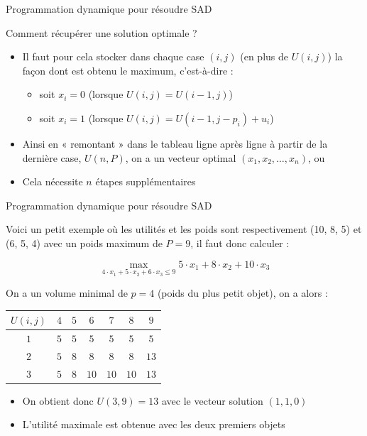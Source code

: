 \documentclass[aspectratio=1610,francais,envcountsect]{beamer}
\begin{document}
\begin{frame}[allowframebreaks]{Programmation dynamique pour résoudre
    SAD}
\begin{block}{Comment récupérer une solution optimale ?}
  \begin{itemize}
  \item Il faut pour cela stocker dans chaque case $(i, j)$ (en plus
    de $U(i, j)$) la façon dont est obtenu le maximum, c’est-à-dire :
    \begin{itemize}
    \item soit $x_i = 0$ (lorsque $U(i, j) = U(i - 1, j)$)
    \item soit $x_i = 1$ (lorsque $U(i, j) = U(i - 1, j - p_i) + u_i$)
    \end{itemize}
  \item Ainsi en « remontant » dans le tableau ligne après ligne à
    partir de la dernière case, $U(n, P)$, on a un vecteur optimal
    $(x_1, x_2, \ldots , x_n)$, ou 
  \item Cela nécessite $n$ étapes supplémentaires
  \end{itemize}
\end{block}
\end{frame}

\begin{frame}{Programmation dynamique pour résoudre SAD
    \insertcontinuationtext}

  \begin{example}

    Voici un petit exemple où les utilités et les poids sont
    respectivement (10, 8, 5) et (6, 5, 4) avec un poids maximum de
    $P = 9$, il faut donc calculer :
    
    \begin{equation}
      \max_{4\cdot x_1+5\cdot x_2+6\cdot x_3\leq 9}5\cdot x_1+8\cdot x_2 + 10\cdot x_3
    \end{equation}
    
    \pause
    
    On a un volume minimal de $p = 4$ (poids du plus petit objet), on
    a alors :
    
    
    \begin{table}[H]
      \centering
      \begin{tabular}{c|cccccc}
        $U(i,j)$ & $4$ & $5$ & $6$ & $7$ & $8$ & $9$\\
        \hline
        $1$ & $5$ & $5$ & $5$ & $5$ & $5$ & $5$\\
        $2$ & $5$ & $8$ & $8$ & $8$ & $8$ & $13$\\
        $3$ & $5$ & $8$ & $10$ & $10$ & $10$ &$13$
      \end{tabular}
    \end{table}
    
    \begin{itemize}
    \item On obtient donc $U(3, 9) = 13$ avec le vecteur solution
      $(1,1,0)$
    \item L’utilité maximale est obtenue avec les deux premiers objets
    \end{itemize}
  \end{example}
\end{frame}
\end{document}
